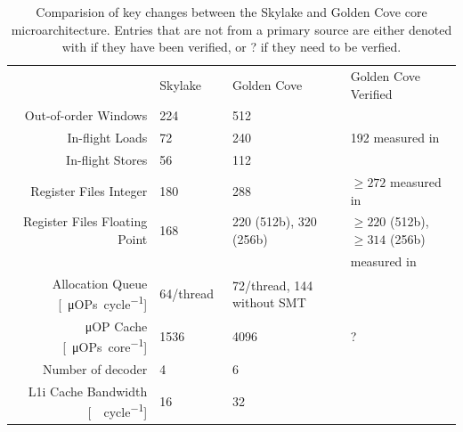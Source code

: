 \begin{table}
	\centering
	\caption{\label{tab:micro-arch-params}Comparision of key changes between the Skylake and Golden Cove core microarchitecture. Entries that are not from a primary source are either denoted with \checkmark if they have been verified, or ? if they need to be verfied.}
	\begin{tabular}{r|lll}
		\toprule
			&	Skylake & Golden Cove & Golden Cove Verified \\
		\rowcolor[HTML]{EFEFEF}Out-of-order Windows		& 224~\cite{Intel_2017_Skylake_SP} & 512~\cite{Intel_2021_Architecture_Day,ServerTheHome_2023_SPR_Press,Wccftech_2023_SPR_Press} & \checkmark~\figref{robsize-reorder} \\
		In-flight Loads & 72~\cite{Intel_2017_Skylake_SP} & 240~\cite{ServerTheHome_2023_SPR_Press,Wccftech_2023_SPR_Press} & 192 measured in~\figref{robsize-load} \\
		\rowcolor[HTML]{EFEFEF}In-flight Stores & 56~\cite{Intel_2017_Skylake_SP} & 112~\cite{ServerTheHome_2023_SPR_Press,Wccftech_2023_SPR_Press} & \checkmark~\figref{robsize-store} \\
		Register Files Integer & 180~\cite{Intel_2017_Skylake_SP} & 288~\cite{ServerTheHome_2023_SPR_Press,Wccftech_2023_SPR_Press} & $\geq 272$ measured in~\figref{robsize-registers} \\
		\rowcolor[HTML]{EFEFEF}Register Files Floating Point & 168~\cite{Intel_2017_Skylake_SP} & 220 (512b), 320 (256b)~\cite{ServerTheHome_2023_SPR_Press,Wccftech_2023_SPR_Press} & $\geq 220$ (512b), $\geq 314$ (256b) \\
		\rowcolor[HTML]{EFEFEF} & & & measured in~\figref{robsize-registers} \\
		Allocation Queue [\SI{}{\micro OPs\per cycle}]& 64/thread~\cite{Intel_2017_Skylake_SP} & 72/thread, 144 without SMT~\cite{Intel_2021_Architecture_Day,ServerTheHome_2023_SPR_Press,Wccftech_2023_SPR_Press,Intel_Optimization_Reference_Manual_050} & \\
		\rowcolor[HTML]{EFEFEF}μOP Cache [\SI{}{\micro OPs\per core}] & \SI{1536}{}~\cite{Wikichip_SkylakeSP} & \SI{4096}{}~\cite{Intel_2021_Architecture_Day} & ? \\
		Number of decoder & \SI{4}{}~\cite{Wikichip_SkylakeSP} & \SI{6}{}~\cite{Intel_2021_Architecture_Day,Intel_Optimization_Reference_Manual_050} & \\
		\rowcolor[HTML]{EFEFEF}L1i Cache Bandwidth [\SI{}{\byte\per cycle}] & \SI{16}{}~\cite{Wikichip_SkylakeSP} & \SI{32}{}~\cite{Intel_Optimization_Reference_Manual_050} & \\

\end{tabular}
\end{table}
